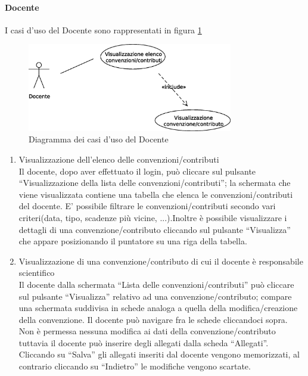  
\paragraph{Docente}
I casi d'uso del Docente sono rappresentati in figura \ref{use_case_diag_teacher}
\begin{figure}[h]
  \caption{Diagramma dei casi d'uso del Docente}
  \label{use_case_diag_teacher}
  \centering
    \includegraphics[width=0.8\textwidth]{images/casi_uso_docente.eps}
\end{figure}

\begin{enumerate}
 
 \item Visualizzazione dell'elenco delle convenzioni/contributi\\
 
 Il docente, dopo aver effettuato il login, può cliccare sul pulsante ``Visualizzazione della lista delle convenzioni/contributi''; la schermata
 che viene visualizzata contiene una tabella che elenca le convenzioni/contributi del docente. E' possibile filtrare le convenzioni/contributi
 secondo vari criteri(data, tipo, scadenze più vicine, ...).Inoltre è possibile visualizzare i dettagli di una convenzione/contributo cliccando sul
 pulsante ``Visualizza'' che appare posizionando il puntatore su una riga della tabella.
 
 \item Visualizzazione di una convenzione/contributo di cui il docente è responsabile scientifico\\
 
 Il docente dalla schermata ``Lista delle convenzioni/contributi'' può cliccare sul pulsante ``Visualizza'' relativo ad una convenzione/contributo; compare una schermata suddivisa in schede analoga a quella della modifica/creazione
 della convenzione. Il docente può navigare fra le schede cliccandoci sopra. Non è permessa nessuna modifica ai dati della convenzione/contributo tuttavia il docente può inserire degli allegati dalla scheda ``Allegati''. Cliccando su ``Salva''
 gli allegati inseriti dal docente vengono memorizzati, al contrario cliccando su ``Indietro'' le modifiche vengono scartate.
 
 
 
\end{enumerate}



